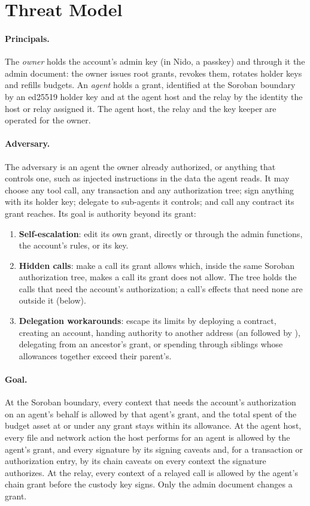 \section{Threat Model}\label{sec:threat}

\paragraph{Principals.} The \emph{owner} holds the account's admin key (in Nido,
a passkey) and through it the admin document: the owner issues root grants,
revokes them, rotates holder keys and refills budgets. An \emph{agent} holds a
grant, identified at the Soroban boundary by an ed25519 holder key and at the
agent host and the relay by the identity the host or relay assigned it. The
agent host, the relay and the key keeper are operated for the owner.

\paragraph{Adversary.} The adversary is an agent the owner already authorized,
or anything that controls one, such as injected instructions in the data the
agent reads. It may choose any tool call, any transaction and any
authorization tree; sign anything with its holder key; delegate to sub-agents
it controls; and call any contract its grant reaches. Its goal is authority
beyond its grant:
\begin{enumerate}
\item \textbf{Self-escalation}: edit its own grant, directly or through the
  admin functions, the account's rules, or its key.
\item \textbf{Hidden calls}: make a call its grant allows which, inside the
  same Soroban authorization tree, makes a call its grant does not allow. The
  tree holds the calls that need the account's authorization; a call's effects
  that need none are outside it (below).
\item \textbf{Delegation workarounds}: escape its limits by deploying a
  contract, creating an account, handing authority to another address
  (an  followed by ), delegating from an
  ancestor's grant, or spending through siblings whose allowances together
  exceed their parent's.
\end{enumerate}

\paragraph{Goal.} At the Soroban boundary, every context that needs the
account's authorization on an agent's behalf is allowed by that agent's grant,
and the total spent of the budget asset at or under any grant stays within its
allowance. At the agent host, every file and network action the host performs
for an agent is allowed by the agent's grant, and every signature by its
signing caveats and, for a transaction or authorization entry, by its chain
caveats on every context the signature authorizes. At the relay, every context of
a relayed call is allowed by the agent's chain grant before the custody key
signs. Only the admin document changes a grant.


